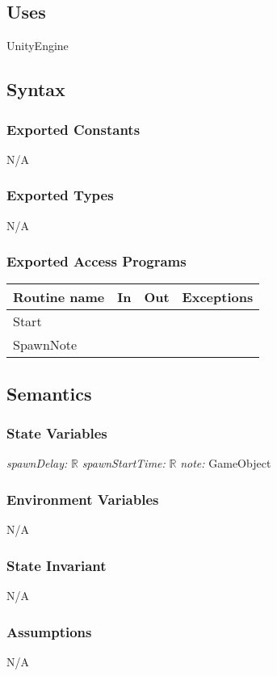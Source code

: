 \documentclass[12pt]{article}
\begin{document}
\subsection{Uses}
UnityEngine

\subsection{Syntax}
\subsubsection{Exported Constants}
N/A
\subsubsection{Exported Types}
N/A
\subsubsection{Exported Access Programs}
\begin{tabular}{| l | l | l | l |}
\hline
\textbf{Routine name} & \textbf{In} & \textbf{Out} & \textbf{Exceptions}\\
\hline
Start   &     &           &          \\
SpawnNote   &     &           &     \\
\hline
\end{tabular}

\subsection{Semantics}
\subsubsection{State Variables}
\textit{spawnDelay:} $\mathbb{R}$
\textit{spawnStartTime:} $\mathbb{R}$
\textit{note:} GameObject

\subsubsection{Environment Variables}
N/A

\subsubsection{State Invariant}
N/A

\subsubsection{Assumptions}
N/A
\end{document}
